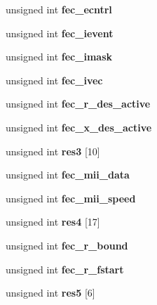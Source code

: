 \begin{DoxyCompactItemize}
unsigned int {\bfseries fec\+\_\+ecntrl}
\item 
\mbox{\label{structfec_a15d6e6ae9a9df8711ca1779b683ad61b}} 
unsigned int {\bfseries fec\+\_\+ievent}
\item 
\mbox{\label{structfec_a99d584cc1ff0e63395dc37dd67df9134}} 
unsigned int {\bfseries fec\+\_\+imask}
\item 
\mbox{\label{structfec_a7c8ba3399b8ddb69b06541ccac5cd81a}} 
unsigned int {\bfseries fec\+\_\+ivec}
\item 
\mbox{\label{structfec_a81a7f713d85bce32a5b7fdea36750e0f}} 
unsigned int {\bfseries fec\+\_\+r\+\_\+des\+\_\+active}
\item 
\mbox{\label{structfec_a0d043c62f320e2e89bf2a2592fcfc93a}} 
unsigned int {\bfseries fec\+\_\+x\+\_\+des\+\_\+active}
\item 
\mbox{\label{structfec_a4db66d67438d43509e69a4076e23f32d}} 
unsigned int {\bfseries res3} \mbox{[}10\mbox{]}
\item 
\mbox{\label{structfec_a123d1b66e65b14f2f209f3022fac7e72}} 
unsigned int {\bfseries fec\+\_\+mii\+\_\+data}
\item 
\mbox{\label{structfec_adb2eb956c865eae078164b64bdf83f4f}} 
unsigned int {\bfseries fec\+\_\+mii\+\_\+speed}
\item 
\mbox{\label{structfec_aa844e98af8bfb9619abc0c582d1427b0}} 
unsigned int {\bfseries res4} \mbox{[}17\mbox{]}
\item 
\mbox{\label{structfec_aaf1e4249baa52baccd71549afae2575b}} 
unsigned int {\bfseries fec\+\_\+r\+\_\+bound}
\item 
\mbox{\label{structfec_a299b8937cdc1b4ced8e077e383d062da}} 
unsigned int {\bfseries fec\+\_\+r\+\_\+fstart}
\item 
\mbox{\label{structfec_a463b7e8f889a66ffc55d9c98e7f57fe9}} 
unsigned int {\bfseries res5} \mbox{[}6\mbox{]}
\item 

\end{DoxyCompactItemize}
